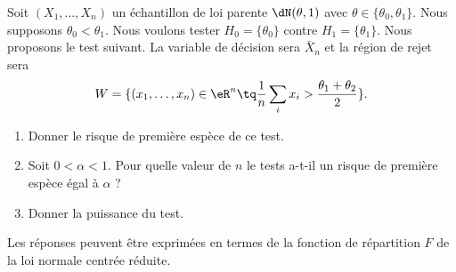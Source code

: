 \begin{example}

	Soit \( (X_1,\ldots,X_n)\) un échantillon de loi parente \( \dN(\theta,1)\) avec \( \theta\in\{ \theta_0,\theta_1 \}\). Nous supposons \( \theta_0<\theta_1\). Nous voulons tester \( H_0=\{ \theta_0 \}\) contre \( H_1=\{ \theta_1 \}\). Nous proposons le test suivant. La variable de décision sera \( \bar X_n\) et la région de rejet sera
	\begin{equation}
		W=\{ (x_1,\ldots,x_n)\in\eR^n\tq\frac{1}{ n }\sum_ix_i>\frac{ \theta_1+\theta_2 }{ 2 } \}.
	\end{equation}

	\begin{enumerate}
		\item
		      Donner le risque de première espèce de ce test.
		\item
		      Soit \( 0<\alpha<1\). Pour quelle valeur de \( n\) le tests a-t-il un risque de première espèce égal à \( \alpha\) ?
		\item
		      Donner la puissance du test.
	\end{enumerate}
	Les réponses peuvent être exprimées en termes de la fonction de répartition \( F\) de la loi normale centrée réduite.


\end{example}
